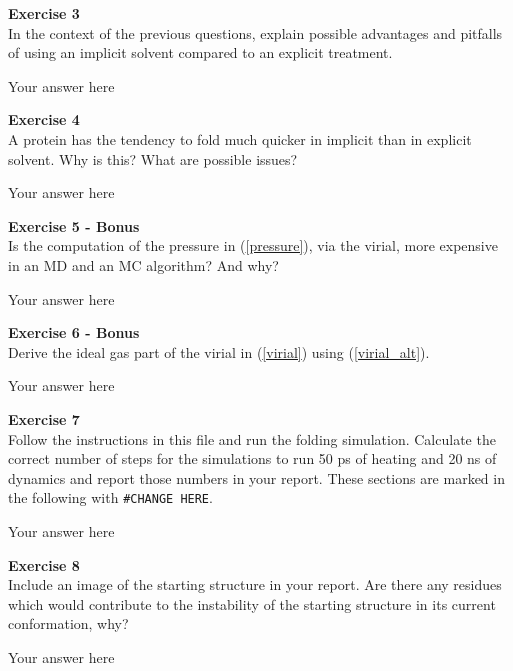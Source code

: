\documentclass{article}
\begin{document}
\begin{mdframed}
\textbf{Exercise 3}\\
In the context of the previous questions, explain possible advantages and pitfalls of using an implicit solvent compared to an explicit treatment.
\end{mdframed}

Your answer here

\begin{mdframed}
\textbf{Exercise 4}\\
A protein has the tendency to fold much quicker in implicit than in explicit solvent. Why is this? What are possible issues?
\end{mdframed}

Your answer here

\begin{mdframed}
\textbf{Exercise 5 - Bonus}\\
Is the computation of the pressure in
(\ref{pressure}), via the virial, more expensive in an MD and an MC
algorithm? And why?
\end{mdframed}

Your answer here

\begin{mdframed}
\textbf{Exercise 6 - Bonus}\\
Derive the ideal gas part of the virial in (\ref{virial}) using (\ref{virial_alt}).
\end{mdframed}

Your answer here

\begin{mdframed}
\textbf{Exercise 7}\\
Follow the instructions in this file and run the folding simulation.
Calculate the correct number of steps for the simulations to run 50 ps of heating and 20 ns of dynamics and report those numbers in your report. These sections are marked in the following with \texttt{\#CHANGE HERE}.
\end{mdframed}

Your answer here

\begin{mdframed}
\textbf{Exercise 8}\\
Include an image of the starting structure in your report. Are there any residues which  would contribute to the instability of the starting structure in its current conformation, why?
\end{mdframed}

Your answer here
\end{document}

